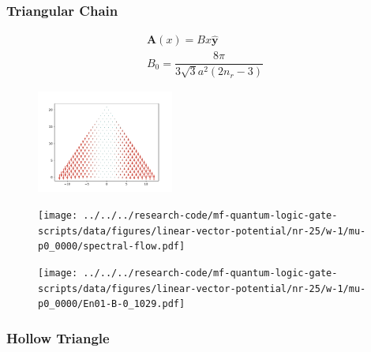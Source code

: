 \documentclass[xcolor=dvipsnames,10pt,aspectratio=169]{beamer}
\let\oldhat\hat
\renewcommand{\hat}[1]{\oldhat{\mathbf{#1}}}
\renewcommand{\vec}[1]{\mathbf{#1}}
\begin{document}
  \begin{frame}
    \frametitle{Triangular Chain}

    \begin{multicols}{2}
    \vspace{-2em}
    \small
    \begin{gather*}
      \vec{A}(x) = B x \hat{y} \\
      B_0 = \dfrac{8 \pi}{3\sqrt{3} a^2 (2 n_r - 3)}
    \end{gather*}

    \vspace{-4em}
    \begin{figure}
      \includegraphics[width=0.4\textwidth]{./figures/vector-potential-field.pdf}
    \end{figure}

    \begin{figure}
      \center
      \hspace{-1.25em}
      \texttt{[image: ../../../research-code/mf-quantum-logic-gate-scripts/data/figures/linear-vector-potential/nr-25/w-1/mu-p0\_0000/spectral-flow.pdf]}
    \end{figure}

    \vspace{-1em}

    \begin{figure}
      \texttt{[image: ../../../research-code/mf-quantum-logic-gate-scripts/data/figures/linear-vector-potential/nr-25/w-1/mu-p0\_0000/En01-B-0\_1029.pdf]}
    \end{figure}
    \end{multicols}

  \end{frame}

  \begin{frame}
    \frametitle{Hollow Triangle}

    \begin{figure}
    \end{figure}
  \end{frame}
\end{document}
